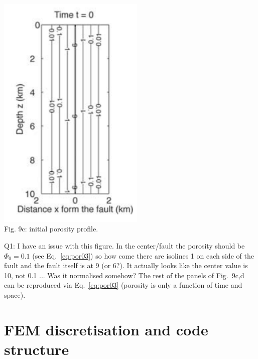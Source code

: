 \begin{center}
\includegraphics[width=7cm]{python_codes/fieldstone_126/images/grfr03b}\\
{\captionfont Fig. 9c: initial porosity profile.}
\end{center}

{\color{red} Q1: I have an issue with this figure. In the center/fault the porosity
should be $\Phi_0=0.1$ (see Eq.~\eqref{eq:por03}) so how come 
there are isolines 1 on each side of the fault and the fault itself is at 9 (or 6?).
It actually looks like the center value is 10, not 0.1 ... Was it normalised somehow? }
The rest of the panels of Fig.~9c,d can be reproduced via Eq.~\eqref{eq:por03} 
(porosity is only a function of time and space).


\newpage
\section*{FEM discretisation and code structure}

